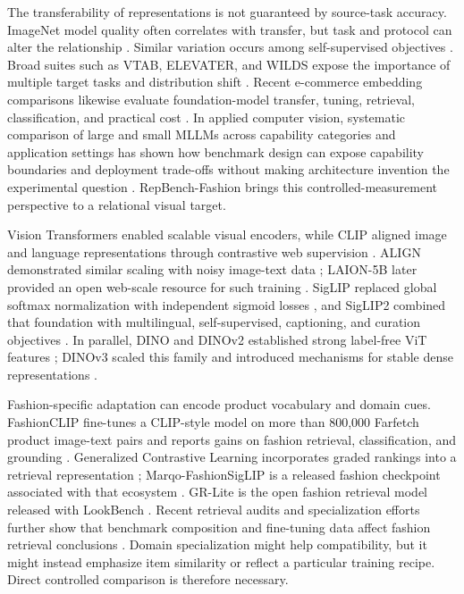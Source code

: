 \documentclass[pdflatex,sn-mathphys-num,iicol]{sn-jnl}
\begin{document}
The transferability of representations is not guaranteed by source-task accuracy. ImageNet model quality often correlates with transfer, but task and protocol can alter the relationship \cite{kornblith2019transfer}. Similar variation occurs among self-supervised objectives \cite{ericsson2021transfer}. Broad suites such as VTAB, ELEVATER, and WILDS expose the importance of multiple target tasks and distribution shift \cite{zhai2019vtab,li2022elevater,koh2021wilds}. Recent e-commerce embedding comparisons likewise evaluate foundation-model transfer, tuning, retrieval, classification, and practical cost \cite{czerwinska2025ecommerce}. In applied computer vision, systematic comparison of large and small MLLMs across capability categories and application settings has shown how benchmark design can expose capability boundaries and deployment trade-offs without making architecture invention the experimental question \cite{feng2025mllmbenchmark}. RepBench-Fashion brings this controlled-measurement perspective to a relational visual target.

Vision Transformers \cite{dosovitskiy2021vit} enabled scalable visual encoders, while CLIP aligned image and language representations through contrastive web supervision \cite{radford2021clip}. ALIGN demonstrated similar scaling with noisy image-text data \cite{jia2021align}; LAION-5B later provided an open web-scale resource for such training \cite{schuhmann2022laion}. SigLIP replaced global softmax normalization with independent sigmoid losses \cite{zhai2023siglip}, and SigLIP2 combined that foundation with multilingual, self-supervised, captioning, and curation objectives \cite{tschannen2025siglip2}. In parallel, DINO and DINOv2 established strong label-free ViT features \cite{caron2021dino,oquab2024dinov2}; DINOv3 scaled this family and introduced mechanisms for stable dense representations \cite{simeoni2025dinov3}.

Fashion-specific adaptation can encode product vocabulary and domain cues. FashionCLIP fine-tunes a CLIP-style model on more than 800,000 Farfetch product image-text pairs and reports gains on fashion retrieval, classification, and grounding \cite{chia2022fashionclip}. Generalized Contrastive Learning incorporates graded rankings into a retrieval representation \cite{zhu2025gcl}; Marqo-FashionSigLIP is a released fashion checkpoint associated with that ecosystem \cite{marqo2024fashionsiglip}. GR-Lite is the open fashion retrieval model released with LookBench \cite{gao2026lookbench}. Recent retrieval audits and specialization efforts further show that benchmark composition and fine-tuning data affect fashion retrieval conclusions \cite{czerwinska2025ecommerce,xue2026zooclaw}. Domain specialization might help compatibility, but it might instead emphasize item similarity or reflect a particular training recipe. Direct controlled comparison is therefore necessary.
\end{document}
